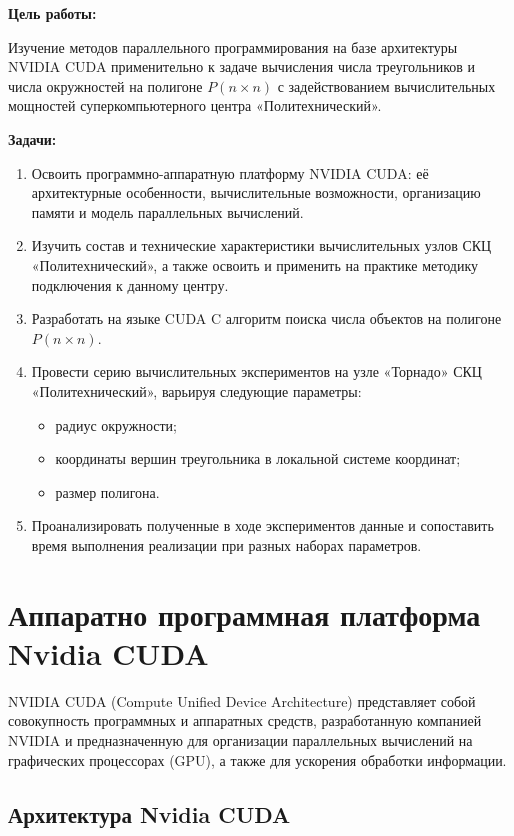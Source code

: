 \documentclass{article}[14pt]
\begin{document}
\noindent \textbf{Цель работы:}

Изучение методов параллельного программирования на базе архитектуры NVIDIA CUDA применительно к задаче вычисления числа треугольников и числа
окружностей на полигоне $P (n \times n)$ с задействованием вычислительных мощностей суперкомпьютерного центра «Политехнический».


\noindent \textbf{Задачи:}

\begin{enumerate}
\item Освоить программно-аппаратную платформу NVIDIA CUDA: её архитектурные особенности, вычислительные возможности, организацию памяти и модель параллельных вычислений.
\item Изучить состав и технические характеристики вычислительных узлов СКЦ «Политехнический», а также освоить и применить на практике методику подключения к данному центру.
\item Разработать на языке CUDA C алгоритм поиска числа объектов на полигоне $P (n \times n)$.
\item Провести серию вычислительных экспериментов на узле «Торнадо» СКЦ «Политехнический», варьируя следующие параметры:
  \begin{itemize}
    \item радиус окружности;
    \item координаты вершин треугольника в локальной системе координат;
    \item размер полигона.
  \end{itemize}
\item Проанализировать полученные в ходе экспериментов данные и сопоставить время выполнения реализации при разных наборах параметров.
\end{enumerate}

\pagebreak

\section{Аппаратно программная платформа Nvidia CUDA}

NVIDIA CUDA (Compute Unified Device Architecture) представляет собой совокупность программных и аппаратных средств, разработанную 
компанией NVIDIA и предназначенную для организации параллельных вычислений на графических процессорах (GPU), а также для ускорения 
обработки информации.

\subsection{Архитектура Nvidia CUDA}
\end{document}
